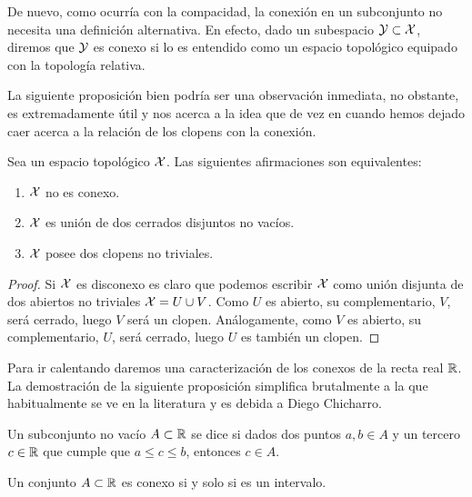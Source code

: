 \begin{obs}
	De nuevo, como ocurría con la compacidad, la conexión en un subconjunto no necesita una definición alternativa. En efecto, dado un subespacio $\mathcal{Y}\subset\mathcal{X}$, diremos que $\mathcal{Y}$ es conexo si lo es entendido como un espacio topológico equipado con la topología relativa.
\end{obs}
La siguiente proposición bien podría ser una observación inmediata, no obstante, es extremadamente útil y nos acerca a la idea que de vez en cuando hemos dejado caer acerca a la relación de los clopens con la conexión.
\begin{prop}
	Sea un espacio topológico $\mathcal{X}$. Las siguientes afirmaciones son equivalentes:
	\begin{enumerate}
		\item $\mathcal{X}$ no es conexo.
		\item $\mathcal{X}$ es unión de dos cerrados disjuntos no vacíos.
		\item $\mathcal{X}$ posee dos clopens no triviales.
	\end{enumerate}
\end{prop}
\begin{proof}
	Si $\mathcal{X}$ es disconexo es claro que podemos escribir $\mathcal{X}$ como unión disjunta de dos abiertos no triviales $\mathcal{X}=U\cup V$. Como $U$ es abierto, su complementario, $V$, será cerrado, luego $V$ será un clopen. Análogamente, como $V$ es abierto, su complementario, $U$, será cerrado, luego $U$ es también un clopen.
\end{proof}
Para ir calentando daremos una caracterización de los conexos de la recta real $\mathbb{R}$. La demostración de la siguiente proposición simplifica brutalmente a la que habitualmente se ve en la literatura y es debida a Diego Chicharro.
\begin{defi}[Intervalo]
	Un subconjunto no vacío $A\subset\mathbb{R}$ se dice  si dados dos puntos $a,b\in A$ y un tercero $c\in\mathbb{R}$ que cumple que $a\leq c\leq b$, entonces $c\in A$. 
\end{defi}
\begin{prop}
	Un conjunto $A\subset \mathbb{R}$ es conexo si y solo si es un intervalo. 
\end{prop}
